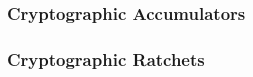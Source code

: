 


\subsubsection{Cryptographic Accumulators}\label{future_sec:cryptographic_accumulators}


\subsubsection{Cryptographic Ratchets}\label{future_sec:cryptographic_ratchets}

